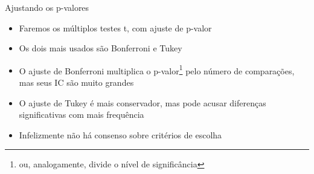 \documentclass{beamer}
\begin{document}
\begin{frame}{Ajustando os p-valores}
  \begin{itemize}
    \footnotesize
  \item Faremos os múltiplos testes t, com ajuste de p-valor
  \item Os dois mais usados são Bonferroni e Tukey
    \bigskip
    \bigskip
 \item O ajuste de Bonferroni multiplica o p-valor\footnote{ou, analogamente, divide o nível de significância} pelo número de comparações, mas seus IC são muito grandes
    \bigskip
 \item O ajuste de Tukey é mais conservador, mas pode acusar diferenças significativas com mais frequência
    \bigskip
    \bigskip
 \item Infelizmente não há consenso sobre critérios de escolha
  \end{itemize}
\end{frame}
\end{document}

